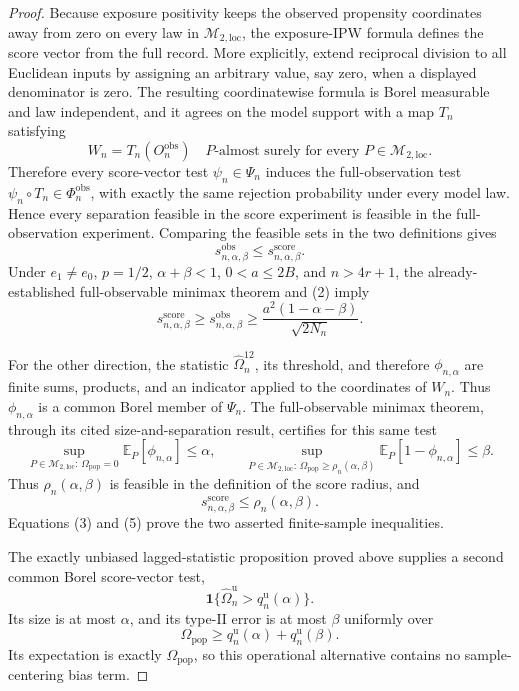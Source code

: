 \documentclass{article}
\begin{document}
\begin{proof}
Because exposure positivity keeps the observed propensity coordinates away from zero on every law in \(\mathcal M_{2,\mathrm{loc}}\), the exposure-IPW formula defines the score vector from the full record.  More explicitly, extend reciprocal division to all Euclidean inputs by assigning an arbitrary value, say zero, when a displayed denominator is zero.  The resulting coordinatewise formula is Borel measurable and law independent, and it agrees on the model support with a map \(T_n\) satisfying
\[
 W_n=T_n(O_n^{\mathrm{obs}})
 \quad P\text{-almost surely for every }P\in\mathcal M_{2,\mathrm{loc}}. \tag{1}
\]
Therefore every score-vector test \(\psi_n\in\Psi_n\) induces the full-observation test \(\psi_n\circ T_n\in\Phi_n^{\mathrm{obs}}\), with exactly the same rejection probability under every model law.  Hence every separation feasible in the score experiment is feasible in the full-observation experiment.  Comparing the feasible sets in the two definitions gives
\[
 s_{n,\alpha,\beta}^{\mathrm{obs}}
 \le s_{n,\alpha,\beta}^{\mathrm{score}}. \tag{2}
\]
Under \(e_1\ne e_0\), \(p=1/2\), \(\alpha+\beta<1\), \(0<a\le2B\), and \(n>4r+1\), the already-established full-observable minimax theorem and (2) imply
\[
 s_{n,\alpha,\beta}^{\mathrm{score}}
 \ge s_{n,\alpha,\beta}^{\mathrm{obs}}
 \ge \frac{a^2(1-\alpha-\beta)}{\sqrt{2N_n}}. \tag{3}
\]

For the other direction, the statistic \(\widehat\Omega_n^{12}\), its threshold, and therefore \(\phi_{n,\alpha}\) are finite sums, products, and an indicator applied to the coordinates of \(W_n\).  Thus \(\phi_{n,\alpha}\) is a common Borel member of \(\Psi_n\).  The full-observable minimax theorem, through its cited size-and-separation result, certifies for this same test
\[
 \sup_{P\in\mathcal M_{2,\mathrm{loc}}:\,\Omega_{\mathrm{pop}}=0}
 \mathbb E_P[\phi_{n,\alpha}]\le\alpha,
 \qquad
 \sup_{P\in\mathcal M_{2,\mathrm{loc}}:\,\Omega_{\mathrm{pop}}\ge\rho_n(\alpha,\beta)}
 \mathbb E_P[1-\phi_{n,\alpha}]\le\beta. \tag{4}
\]
Thus \(\rho_n(\alpha,\beta)\) is feasible in the definition of the score radius, and
\[
 s_{n,\alpha,\beta}^{\mathrm{score}}
 \le\rho_n(\alpha,\beta). \tag{5}
\]
Equations (3) and (5) prove the two asserted finite-sample inequalities.

The exactly unbiased lagged-statistic proposition proved above supplies a second common Borel score-vector test,
\[
 \mathbf 1\{\widehat\Omega_n^{\mathrm u}>q_n^{\mathrm u}(\alpha)\}. \tag{6}
\]
Its size is at most \(\alpha\), and its type-II error is at most \(\beta\) uniformly over
\[
 \Omega_{\mathrm{pop}}
 \ge q_n^{\mathrm u}(\alpha)+q_n^{\mathrm u}(\beta). \tag{7}
\]
Its expectation is exactly \(\Omega_{\mathrm{pop}}\), so this operational alternative contains no sample-centering bias term.


\end{proof}
\end{document}
